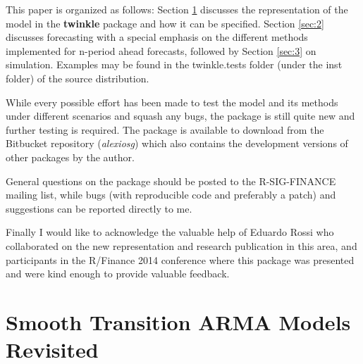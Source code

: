 This paper is organized as follows: Section \ref{sec:1} discusses the
representation of the model in the \textbf{twinkle} package and how it can be
specified. Section \ref{sec:2} discusses forecasting with a special emphasis on
the different methods implemented for n-period ahead forecasts, followed by 
Section \ref{sec:3} on simulation. Examples may be found in the twinkle.tests
folder (under the inst folder) of the source distribution.

While every possible effort has been made to test the model and its methods
under different scenarios and squash any bugs, the package is still quite new
and further testing is required. The package is available to download from the
Bitbucket repository (\emph{alexiosg}) which also contains the development versions
of other packages by the author.

General questions on the package should be posted to the R-SIG-FINANCE mailing
list, while bugs (with reproducible code and preferably a patch) and 
suggestions can be reported directly to me.

Finally I would like to acknowledge the valuable help of Eduardo Rossi who
collaborated on the new representation and research publication in this area,
and participants in the R/Finance 2014 conference where this package was
presented and were kind enough to provide valuable feedback.

\section{Smooth Transition ARMA Models Revisited}\label{sec:1}
